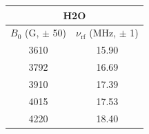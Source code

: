 \begin{tabular}{cc}
\hline
\multicolumn{2}{c}{H2O} \\
\hline
$B_0$ (G, $\pm$ 50) & $\nu_{\mathrm{rf}}$ (MHz, $\pm$ 1) \\
\hline
3610 & 15.90 \\
3792 & 16.69 \\
3910 & 17.39 \\
4015 & 17.53 \\
4220 & 18.40 \\
\hline
\end{tabular}
